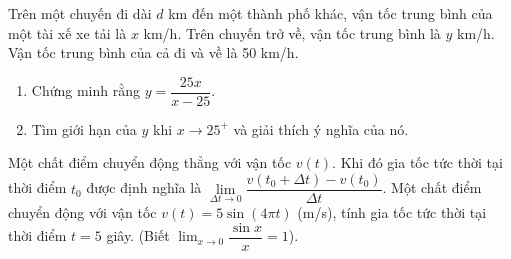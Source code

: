 \begin{bt}%
Trên một chuyến đi dài $d$ km đến một thành phố khác, vận tốc trung bình của một tài xế xe tải là $x$ km/h. Trên chuyến trở về, vận tốc trung bình là $y$ km/h. Vận tốc trung bình của cả đi và về là 50 km/h.
\begin{enumerate}
\item Chứng minh rằng $y= \dfrac{25x}{x-25}$.
\item Tìm giới hạn của $y$ khi $x \rightarrow 25^{+}$ và giải thích ý nghĩa của nó.
\end{enumerate}
\end{bt}

\begin{bt}%
Một chất điểm chuyển động thẳng với vận tốc $v(t)$. Khi đó gia tốc tức thời tại thời điểm $t_0$ được định nghĩa là $\displaystyle \lim \limits_{\Delta t \to 0} \dfrac{v(t_0+ \Delta t) - v(t_0)}{\Delta t}$. Một chất điểm chuyển động với vận tốc $v(t) = 5 \sin \left (4\pi t\right )$ (m/s), tính gia tốc tức thời tại thời điểm $t=5$ giây.  (Biết $\displaystyle \lim_{x \to 0} \dfrac{\sin x}{x} =1$). 
\end{bt}


